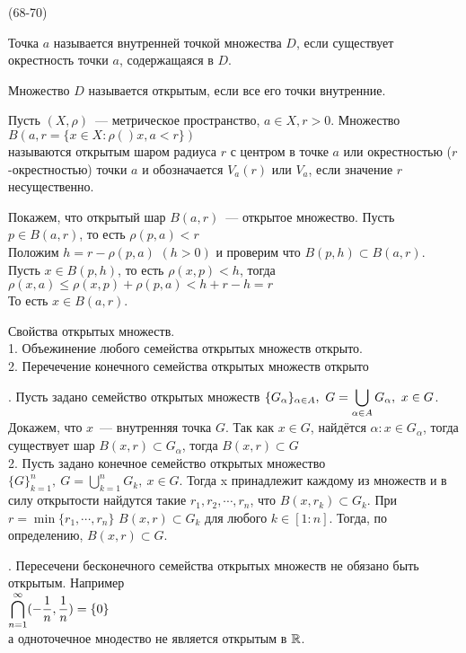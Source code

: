 (68-70)

 \Op Точка $a$ называется внутренней точкой множества $D$, если существует окрестность точки $a$, содержащаяся в $D$.

\Op Множество $D$ называется открытым, если все его точки внутренние.

\Op Пусть $(X, \rho)$~--- метрическое пространство, $a \in X, r > 0$. Множество\\
$B(a, r = \{x \in X: \rho()x, a < r\})$\\
называются открытым шаром радиуса $r$ с центром в точке $a$ или окрестностью ($r$-окрестностью) точки $a$ и обозначается $V_a(r)$ или $V_a$, если  значение $r$ несущественно.

Покажем, что открытый шар $B(a, r)$~--- открытое множество. Пусть $p \in B(a, r)$, то есть $\rho(p, a) < r$\\
Положим $h = r - \rho(p, a)$ $(h > 0)$ и проверим что $B(p, h) \subset B(a, r)$. Пусть $x \in B(p, h)$, то есть $\rho(x, p) < h$, тогда\\
$\rho(x, a) \le \rho(x, p) + \rho(p, a) < h + r - h = r$\\
То есть $x \in B(a, r)$.

\T \q Свойства открытых множеств.\\
1. Объежинение любого семейства открытых множеств открыто.\\
2. Перечечение конечного семейства открытых множеств открыто

. Пусть задано семейство открытых множеств $\{G_\alpha\}_{\alpha \in A},\ G = \displaystyle\bigcup\limits_{\alpha \in A} G_\alpha,\ x \in G$. Докажем, что $x$~--- внутренняя точка $G$. Так как $x \in G$, найдётся $\alpha: x \in G_\alpha$, тогда существует шар $B(x, r) \subset G_\alpha$, тогда $B(x, r) \subset G$\\
2. Пусть задано конечное семейство открытых множество $\{G\}^n_{k = 1},\ G = \bigcup\limits^n_{k = 1} G_k,\ x \in G$. Тогда x принадлежит каждому из множеств и в силу открытости найдутся такие $r_1, r_2, \cdots, r_n$, что $B(x, r_k) \subset G_k$. При $r = \min\{r_1, \cdots, r_n\}$ $B(x, r) \subset G_k$ для любого $k \in [1 : n]$. Тогда, по определению, $B(x, r) \subset G$.

. Пересечени бесконечного семейства открытых множеств не обязано быть открытым. Например\\
$\displaystyle\bigcap\limits^\infty_{n = 1} (-\frac{1}{n}, \frac{1}{n}) = \{0\}$\\
а одноточечное мнодество не является открытым в $\mathbb{R}$.

